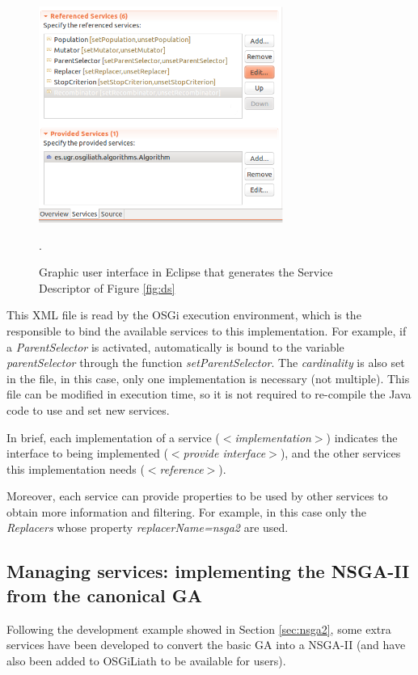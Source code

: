 \begin{figure}
\centering
\includegraphics[width=8cm]{gfx/osgiliath/eclipse.png}

\caption{Graphic user interface in Eclipse that generates the Service Descriptor of Figure \ref{fig:ds} }.
\label{fig:xmlgui}
\end{figure}

This XML file is read by the OSGi execution environment, which is the responsible to bind the available services to this implementation. For example, if a {\em ParentSelector} is activated, automatically is bound to the variable {\em parentSelector} through the function {\em setParentSelector}. The {\em cardinality} is also set in the file, in this case, only one implementation is necessary (not multiple). This file can be modified in execution time, so it is not required to re-compile the Java code to use and set new services.

In brief, each implementation of a service (\textit{$<$im\-ple\-men\-ta\-tion$>$}) indicates the interface to being implemented (\textit{$<$pro\-vi\-de in\-ter\-fa\-ce$>$}), and the other services this implementation needs (\textit{$<$re\-fe\-ren\-ce$>$}). 

Moreover, each service can provide properties to be used by other services to obtain more information and filtering. For example, in this case only the {\em Replacers} whose property {\em replacerName=nsga2} are used.


\subsection{Managing services: implementing the NSGA-II from the canonical GA}

Following the development example showed in Section \ref{sec:nsga2}, some extra services have been developed to convert the basic GA into a NSGA-II (and have also been added to OSGiLiath to be available for users).

